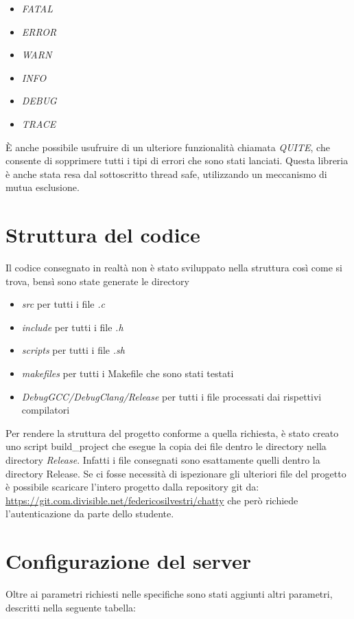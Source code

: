 \documentclass[]{article}
\begin{document}
\begin{itemize}
	\item \textit{FATAL}
	\item \textit{ERROR}
	\item \textit{WARN}
	\item \textit{INFO}
	\item \textit{DEBUG}
	\item \textit{TRACE}
\end{itemize}

\`E anche possibile usufruire di un ulteriore funzionalit\`a chiamata \textit{QUITE}, che consente
di sopprimere tutti i tipi di errori che sono stati lanciati.
Questa libreria \`e anche stata resa dal sottoscritto thread safe, utilizzando un meccanismo
di mutua esclusione.

\section{Struttura del codice}
Il codice consegnato in realt\`a non \`e stato sviluppato nella struttura cos\`i  come si trova,
bens\`i sono state generate le directory

\begin{itemize}
	\item \textit{src} per tutti i file \textit{.c}
	\item \textit{include} per tutti i file \textit{.h}
	\item \textit{scripts} per tutti i file \textit{.sh}
	\item \textit{makefiles} per tutti i Makefile che sono stati testati
	\item \textit{DebugGCC/DebugClang/Release} per tutti i file processati dai rispettivi compilatori
\end{itemize}

Per rendere la struttura del progetto conforme a quella richiesta, \`e stato creato uno script
build\_project che esegue la copia dei file dentro le directory nella directory \textit{Release}.
Infatti i file consegnati sono esattamente quelli dentro la directory Release.
Se ci fosse necessit\`a di ispezionare gli ulteriori file del progetto \`e possibile scaricare
l'intero progetto dalla repository git da:
\url{https://git.com.divisible.net/federicosilvestri/chatty}
che per\`o richiede l'autenticazione da parte dello studente.

\section{Configurazione del server}
Oltre ai parametri richiesti nelle specifiche sono stati aggiunti altri parametri, descritti
nella seguente tabella:
\end{document}
